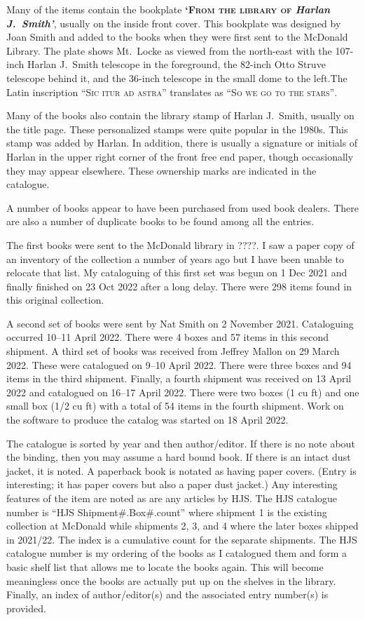 Many of the items contain the bookplate {\bfseries\textsc{`From the
    library of} \textit{Harlan J.~Smith'}}, usually on the inside front
cover. This bookplate was designed by Joan Smith and added to the
books when they were first sent to the McDonald Library. The plate
shows Mt.~Locke as viewed from the north-east with the 107-inch Harlan
J.~Smith telescope in the foreground, the 82-inch Otto Struve
telescope behind it, and the 36-inch telescope in the small dome to
the left.The Latin inscription \textsc{``Sic itur ad astra''}
translates as \textsc{``So we go to the stars''}.

Many of the books also contain the library stamp of Harlan J.~Smith,
usually on the title page. These personalized stamps were quite
popular in the 1980s. This stamp was added by Harlan. In addition,
there is usually a signature or initials of Harlan in the upper right
corner of the front free end paper, though occasionally they may appear
elsewhere.  These ownership marks are indicated in the catalogue.

A number of books appear to have been purchased from used book dealers.
There are also a number of duplicate books to be found among all the
entries. 

The first books were sent to the McDonald library in ????.  I saw a
paper copy of an inventory of the collection a number of years ago but
I have been unable to relocate that list. My cataloguing of this first
set was begun on 1 Dec 2021 and finally finished on 23 Oct 2022 after
a long delay. There were 298 items found in this original collection.

A second set of books were sent by Nat Smith on 2 November 2021.
Cataloguing occurred 10--11 April 2022. There were 4 boxes and 57 items
in this second shipment. A third set of books was received from
Jeffrey Mallon on 29 March 2022. These were catalogued on 9--10 April
2022. There were three boxes and 94 items in the third
shipment. Finally, a fourth shipment was received on 13 April 2022 and
catalogued on 16--17 April 2022. There were two boxes (1 cu ft) and
one small box (1/2 cu ft) with a total of 54 items in the fourth
shipment.  Work on the software to produce the catalog was started on
18 April 2022.

The catalogue is sorted by year and then author/editor. If there is no
note about the binding, then you may assume a hard bound book. If
there is an intact dust jacket, it is noted. A paperback book is
notated as having paper covers. (Entry  is interesting; it
has paper covers but also a paper dust jacket.) Any interesting
features of the item are noted as are any articles by HJS.  The HJS
catalogue number is ``HJS Shipment\#.Box\#.count'' where shipment 1 is
the existing collection at McDonald while shipments 2, 3, and 4 where
the later boxes shipped in 2021/22. The index is a cumulative count
for the separate shipments. The HJS catalogue number is my ordering of
the books as I catalogued them and form a basic shelf list that allows
me to locate the books again.  This will become meaningless once the
books are actually put up on the shelves in the library. Finally, an
index of author/editor(s) and the associated entry number(s) is
provided.

